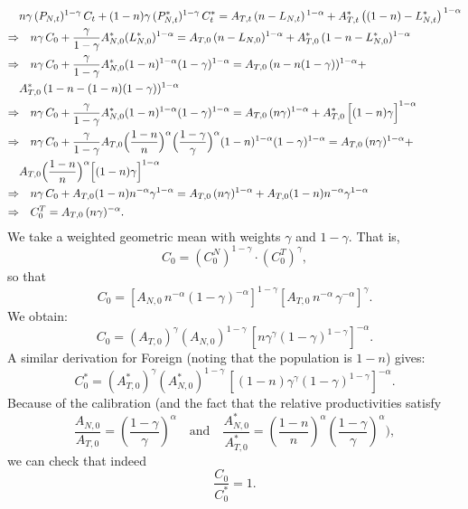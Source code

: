 \documentclass[a4paper,12pt]{article} %
\theoremstyle{nonitalic}
\begin{document}
\begin{align*}
    & n\gamma\,(P_{N,t})^{1-\gamma}\,C_t + (1-n)\gamma\,(P^*_{N,t})^{1-\gamma}\,C^*_t = A_{T,t}\,(n-L_{N,t})^{\,1-\alpha} + A^*_{T,t}\,\big((1-n)-L^*_{N,t}\big)^{\,1-\alpha} \\
    \Rightarrow & \quad n\gamma\,C_0 + \frac{\gamma}{1-\gamma} A_{N,0}^*(L_{N,0}^*)^{1-\alpha} = A_{T,0}\,(n - L_{N,0})^{1-\alpha} + A^*_{T,0}\,(1-n - L_{N,0}^*)^{1-\alpha} \\
    \Rightarrow & \quad n\gamma\,C_0 + \frac{\gamma}{1-\gamma} A_{N,0}^*(1-n)^{1-\alpha} (1-\gamma)^{1-\alpha} = A_{T,0}\,(n - n(1-\gamma))^{1-\alpha} + \\
    & A^*_{T,0}\,(1-n - (1-n)(1-\gamma))^{1-\alpha} \\
    \Rightarrow & \quad n\gamma\,C_0 + \frac{\gamma}{1-\gamma} A_{N,0}^*(1-n)^{1-\alpha} (1-\gamma)^{1-\alpha} = A_{T,0}\,(n\gamma)^{1-\alpha} + A^*_{T,0}\,\Bigl[(1-n)\gamma\Bigr]^{1-\alpha} \\
    \Rightarrow & \quad n\gamma\,C_0 + \frac{\gamma}{1-\gamma} A_{T,0} \Bigl(\frac{1-n}{n}\Bigr)^{\alpha} \Bigl(\frac{1-\gamma}{\gamma}\Bigr)^{\alpha} (1-n)^{1-\alpha} (1-\gamma)^{1-\alpha} = A_{T,0}\,(n\gamma)^{1-\alpha} + \\
    & A_{T,0} \Bigl(\frac{1-n}{n}\Bigr)^{\alpha} \Bigl[(1-n)\gamma\Bigr]^{1-\alpha} \\
    \Rightarrow & \quad n\gamma\,C_0 + A_{T,0}(1-n) n^{-\alpha} \gamma^{1-\alpha} = A_{T,0}\,(n\gamma)^{1-\alpha} + A_{T,0} (1-n) n^{-\alpha} \gamma^{1-\alpha} \\
    \Rightarrow & \quad C_0^T = A_{T,0}\,(n\gamma)^{-\alpha}.
\end{align*}
We take a weighted geometric mean with weights $\gamma$ and $1-\gamma$. That is,
\[
C_0 = (C_{0}^N)^{1-\gamma} \cdot (C_{0}^T)^{\gamma},
\]
so that
\[
C_0 = \left[A_{N,0}\, n^{-\alpha}(1-\gamma)^{-\alpha}\right]^{1-\gamma}
\left[A_{T,0}\, n^{-\alpha}\,\gamma^{-\alpha}\right]^{\gamma}.
\]
We obtain:
\[
\boxed{
C_0 = (A_{T,0})^{\gamma}(A_{N,0})^{1-\gamma}\, \left[n \gamma^{\gamma}(1-\gamma)^{1-\gamma}\right]^{-\alpha}.
}
\]
A similar derivation for Foreign (noting that the population is $1-n$) gives:
\[
\boxed{
C^*_0 = (A^*_{T,0})^{\gamma}(A^*_{N,0})^{1-\gamma}\,\left[(1-n)\gamma^{\gamma}(1-\gamma)^{1-\gamma}\right]^{-\alpha}.
}
\]
Because of the calibration (and the fact that the relative productivities satisfy
\[
\frac{A_{N,0}}{A_{T,0}} = \left(\frac{1-\gamma}{\gamma}\right)^{\alpha} \quad \text{and} \quad \frac{A^*_{N,0}}{A^*_{T,0}} = \left(\frac{1-n}{n}\right)^{\alpha}\left(\frac{1-\gamma}{\gamma}\right)^{\alpha}),
\]
we can check that indeed
\[
\frac{C_0}{C^*_0}=1.
\]
\end{document}
